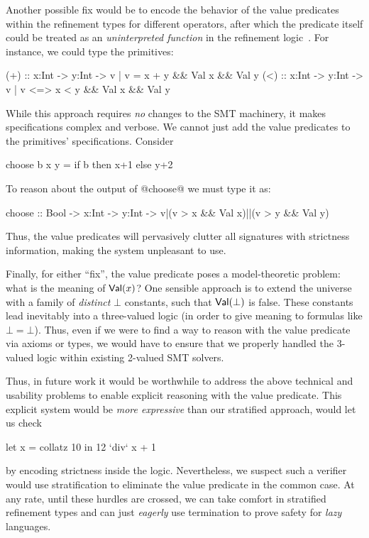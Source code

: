 %
Another possible fix would be to encode the behavior of the
value predicates within the refinement types for different 
operators, after which the predicate itself could be treated 
as an \emph{uninterpreted function} in the refinement 
logic~\cite{bradleybook}. For instance, we could type 
the primitives:
%
\begin{code}
 (+) :: x:Int -> y:Int -> {v | v  =  x + y && Val x && Val y}
 (<) :: x:Int -> y:Int -> {v | v <=> x < y && Val x && Val y}
\end{code}
%
While this approach requires \emph{no} changes to the SMT 
machinery, it makes specifications complex and verbose. 
%
%
We cannot just add the value predicates to the primitives' 
specifications. Consider 
%
\begin{code}
 choose b x y = if b then x+1 else y+2
\end{code}
%
To reason about the output of @choose@ we must type it as:
%
\begin{code}
 choose :: Bool -> x:Int -> y:Int -> {v|(v > x && Val x)||(v > y && Val y)}  
\end{code}
%
Thus, the value predicates will pervasively clutter all 
signatures with strictness information, making the system 
unpleasant to use.


Finally, for either ``fix'', the value predicate poses a 
model-theoretic problem: 
what is the meaning of $\mathsf{Val}(x)$? 
%
One sensible approach is to extend the universe with a family of 
\emph{distinct} $\bot$ constants, such that $\mathsf{Val}(\bot)$ is false.
%
These constants lead inevitably into a three-valued logic 
(in order to give meaning to formulas like $\bot = \bot$).
%
Thus, even if we were to find a way to reason with the value 
predicate via axioms or types, we would have to ensure that 
we properly handled the 3-valued logic within 
existing 2-valued SMT solvers.

Thus, in future work it would be worthwhile to address the above 
technical and usability problems to enable explicit reasoning with 
the value predicate.
%
This explicit system would be \emph{more expressive} than our 
stratified approach, \eg would let us check 
%
\begin{code}
  let x = collatz 10 in 12 `div` x + 1
\end{code}
%
by encoding strictness inside the logic. Nevertheless, we suspect
such a verifier would use stratification to eliminate the value
predicate in the common case.
%
At any rate, until these hurdles are crossed, we can take comfort in
stratified refinement types and can just \emph{eagerly}
use termination to prove safety for \emph{lazy} languages.

